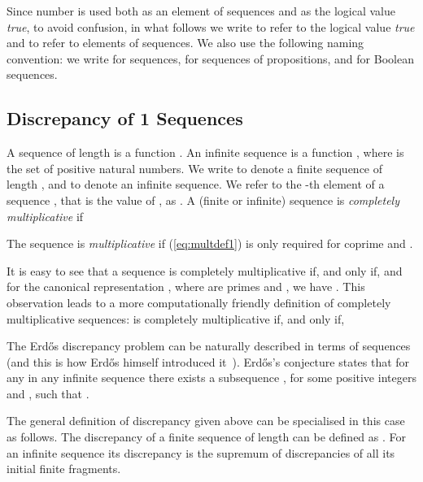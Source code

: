 \documentclass{article} \usepackage[utf8]{inputenc}
\begin{document}
Since number  is used both as an element of  sequences and 
as the logical value \emph{true}, to avoid confusion,  in what follows we write
 to refer to the logical value \emph{true} and  to refer to elements of
 sequences.  We also use the following naming convention: we write
 for  sequences,  for sequences of
propositions, and  for  Boolean sequences.


\subsection{Discrepancy of 1 Sequences}
A  sequence of length  is a function .  An
infinite  sequence is a function , where  is the
set of positive natural numbers.  We write  to denote a finite
 sequence of length , and  to denote an infinite sequence. We
refer to  the -th element of a sequence , that is the value of ,
as . 
A (finite or infinite)  sequence  is \emph{completely multiplicative} \cite{apostol} if

The sequence is \emph{multiplicative} if (\ref{eq:multdef1}) is only required
for 
coprime  and .

It is easy to see that a sequence  is
completely multiplicative if, and only if,  and for
the canonical representation  , where  are primes and , 
we have .
This observation leads to a more computationally friendly definition of
completely multiplicative sequences:  is completely multiplicative if,
and only if,


\smallskip

The Erd\H{o}s discrepancy problem can be naturally described in terms of 
sequences (and this is how Erd\H{o}s himself introduced it~).
Erd\H{o}s's conjecture states that for any  in any infinite 
sequence  there exists a subsequence , for some positive integers  and , such that . 

The general definition of discrepancy given above can be specialised in this
case as follows. The discrepancy of a finite   sequence
 of length  can be defined as . For an infinite
sequence  its discrepancy is the supremum of discrepancies of all its
initial finite fragments. 
\end{document}
